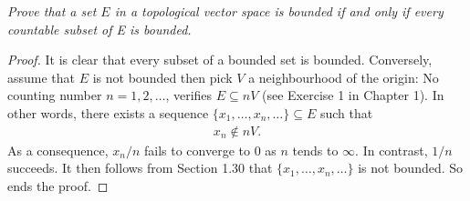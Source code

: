 \textit{
Prove that a set $E$ in a topological vector space is bounded if and only if %
every countable subset of E is bounded.
}
\begin{proof}
It is clear that every subset of a bounded set is bounded. %
Conversely, assume that $E$ is not bounded then pick $V$ %
a neighbourhood of the origin: %
%
No counting number $n=1, 2, \dots$, verifies %
%
  $E\subseteq nV$ (see Exercise 1 in Chapter 1). %
%
In other words, there exists a sequence %
%
  $\{x_1, \dots, x_n, \dots\} \subseteq E$ %
%
such that %
%
\begin{align}
  x_n \notin nV.
\end{align}
%
As a consequence, $x_n /n $ fails to converge to $0$ %
as $n$ tends to $\infty $. %
In contrast, $1/n$ succeeds. %
It then follows from Section 1.30 that %
%
  $\{x_1, \dots, x_n, \dots\}$ %
%
is not bounded. So ends the proof.
\end{proof}
